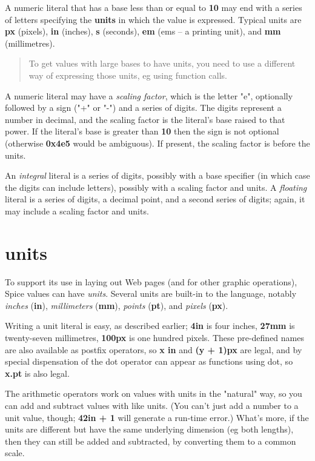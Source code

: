 \documentclass{report}
\begin{document}
A numeric literal that has a base less than or equal to {\bf 10} may end with
a series of letters specifying the {\bf units} in which the value is expressed.
Typical units are {\bf px} (pixels), {\bf in} (inches), {\bf s} (seconds), {\bf em} (ems -- a
printing unit), and {\bf mm} (millimetres).

\begin{quote}To get values with large bases to have units, you need to use a different
way of expressing those units, eg using function calls.
\end{quote}

A numeric literal may have a {\em scaling factor}, which is the letter "e",
optionally followed by a sign ("+" or "-") and a series of digits. The digits
represent a number in decimal, and the scaling factor is the literal's base
raised to that power. If the literal's base is greater than {\bf 10} then the sign
is not optional (otherwise {\bf 0x4e5} would be ambiguous). If present, the
scaling factor is before the units.

An {\em integral} literal is a series of digits, possibly with a base specifier
(in which case the digits can include letters), possibly with a scaling factor
and units. A {\em floating} literal is a series of digits, a decimal point, and a
second series of digits; again, it may include a scaling factor and units.\chapter{units}


To support its use in laying out Web pages (and for other graphic operations),
Spice values can have {\em units}. Several units are built-in to the language,
notably {\em inches} ({\bf in}), {\em millimeters} ({\bf mm}), {\em points} ({\bf pt}), and {\em pixels}
({\bf px}).

Writing a unit literal is easy, as described earlier; {\bf 4in} is four inches,
{\bf 27mm} is twenty-seven millimetres, {\bf 100px} is one hundred pixels. These
pre-defined names are also available as postfix operators, so {\bf x in} and
{\bf (y + 1)px} are legal, and by special dispensation of the dot operator can
appear as functions using dot, so {\bf x.pt} is also legal.

The arithmetic operators work on values with units in the "natural" way,
so you can add and subtract values with like units. (You can't just add a
number to a unit value, though; {\bf 42in + 1} will generate a run-time error.)
What's more, if the units are different but have the same underlying
dimension (eg both lengths), then they can still be added and subtracted, by
converting them to a common scale.
\end{document}
